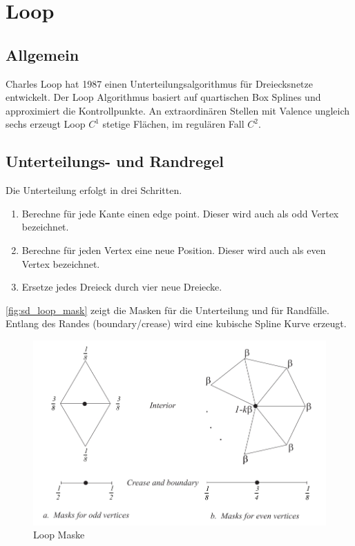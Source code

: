 \section{Loop}

\subsection{Allgemein}

Charles Loop hat 1987 einen Unterteilungsalgorithmus für Dreiecksnetze entwickelt.
Der Loop Algorithmus basiert auf quartischen Box Splines und approximiert die Kontrollpunkte.
An extraordinären Stellen mit Valence ungleich sechs erzeugt Loop \(C^1\) stetige Flächen,
im regulären Fall \(C^2\).
\cite[S. 70f]{Zorin.subdivcourse} \cite[S. 56f]{Standford.24.07.2015}

\subsection{Unterteilungs- und Randregel}

Die Unterteilung erfolgt in drei Schritten.
\begin{enumerate}
\item Berechne für jede Kante einen edge point. Dieser wird auch als odd Vertex bezeichnet.
\item Berechne für jeden Vertex eine neue Position. Dieser wird auch als even Vertex bezeichnet.
\item Ersetze jedes Dreieck durch vier neue Dreiecke.
\end{enumerate}

\autoref{fig:sd_loop_mask} zeigt die Masken für die Unterteilung
und für Randfälle.
Entlang des Randes (boundary/crease) wird eine kubische Spline Kurve erzeugt.
\cite[S. 70]{Zorin.subdivcourse}
\begin{figure}
\centering
\includegraphics[width=1.0\textwidth]{content/media/sd_loop_mask.jpg}
\caption{Loop Maske \cite[S. 70f]{Zorin.subdivcourse}}
\label{fig:sd_loop_mask}
\end{figure}

